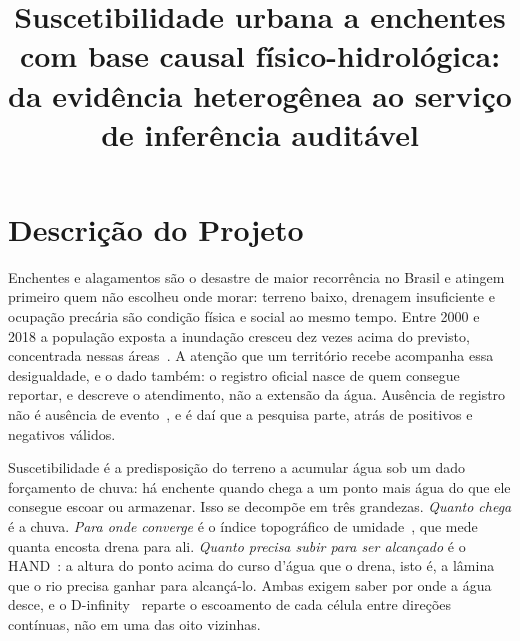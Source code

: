 \documentclass[conference]{IEEEtran}
\begin{document}
\title{Suscetibilidade urbana a enchentes com base causal
físico-hidrológica: da evidência heterogênea ao serviço de inferência
auditável}

\author{
}

\maketitle

\section{Descrição do Projeto}

Enchentes e alagamentos são o desastre de maior recorrência no Brasil e atingem
primeiro quem não escolheu onde morar: terreno baixo, drenagem insuficiente e
ocupação precária são condição física e social ao mesmo tempo. Entre 2000 e 2018
a população exposta a inundação cresceu dez vezes acima do previsto, concentrada
nessas áreas~\cite{tellman2021}. A atenção que um território recebe acompanha
essa desigualdade, e o dado também: o registro oficial nasce de quem consegue
reportar, e descreve o atendimento, não a extensão da água. Ausência de registro não é ausência de
evento~\cite{li2022pul,agostini2024}, e é daí que a pesquisa parte, atrás de
positivos e negativos válidos.

Suscetibilidade é a predisposição do terreno a acumular água sob um dado
forçamento de chuva: há enchente quando chega a um ponto mais água do que ele
consegue escoar ou armazenar. Isso se decompõe em três grandezas. \emph{Quanto chega} é a chuva. \emph{Para onde
converge} é o índice topográfico de umidade~\cite{beven1979}, que mede quanta
encosta drena para ali. \emph{Quanto precisa subir para ser alcançado} é
o HAND~\cite{renno2008}: a altura do ponto acima do curso d'água que o drena, isto
é, a lâmina que o rio precisa ganhar para alcançá-lo. Ambas exigem saber por
onde a água desce, e o D-infinity~\cite{tarboton1997} reparte o escoamento de
cada célula entre direções contínuas, não em uma das oito vizinhas.
\end{document}
